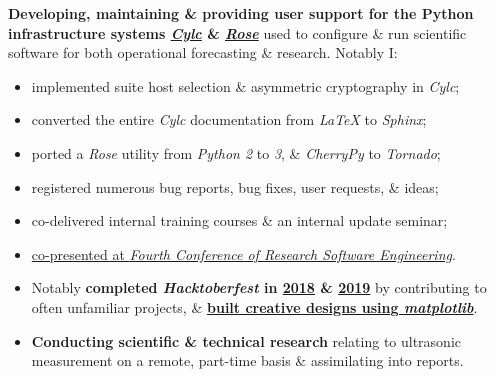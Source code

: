 \documentclass[10pt,a4paper]{protocol}
\begin{document}
	\textbf{Developing, maintaining \& providing user support for the Python infrastructure systems \href{https://github.com/cylc}{\textit{Cylc}} \& \href{https://github.com/metomi/rose}{\textit{Rose}}} used to configure \& run scientific software for both operational forecasting \& research. Notably I:
	\begin{itemize}
	  \itemsep0em
	  \item implemented suite host selection \& asymmetric cryptography in \textit{Cylc};
	  \item converted the entire \textit{Cylc} documentation from \textit{LaTeX} to \textit{Sphinx};
	  \item ported a \textit{Rose} utility from \textit{Python 2} to \textit{3}, \& \textit{CherryPy} to \textit{Tornado};
	  \item registered numerous bug reports, bug fixes, user requests, \& ideas;
	  \item co-delivered internal training courses \& an internal update seminar;
	  \item \href{https://rseconuk2019.sched.com/event/QSSI/5d2-hpc-pursuing-and-supporting-reproducible-workflows-for-all-with-cylc}{co-presented at \textit{Fourth Conference of Research Software Engineering}}.
	\end{itemize}
\divider
{}
\begin{itemize}
	\item Notably \textbf{completed \textit{Hacktoberfest} in \href{https://github.com/sadielbartholomew?tab=overview&from=2018-10-01&to=2018-10-31}{2018} \& \href{https://github.com/sadielbartholomew?tab=overview&from=2019-10-01&to=2019-10-31}{2019}} by contributing to often unfamiliar projects, \& \href{https://github.com/sadielbartholomew/creative-matplotlib}{\textbf{built creative designs using \textit{matplotlib}}}.
\end{itemize}

\divider

\begin{itemize}
	\item \textbf{Conducting scientific \& technical research} relating to ultrasonic measurement on a remote, part-time basis \& assimilating into reports.
\end{itemize}
\divider
\end{document}

